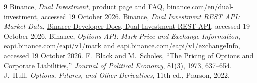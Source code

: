 \documentclass[11pt]{article}
\begin{document}
\begin{thebibliography}{9}
Binance, \emph{Dual Investment}, product page and FAQ, \href{https://www.binance.com/en/dual-investment}{binance.com/en/dual-investment}, accessed 19 October 2026.
Binance, \emph{Dual Investment REST API: Market Data}, \href{https://developers.binance.com/en/docs/catalog/investment-and-services-dual-investment/api/rest-api/market-data}{Binance Developer Docs, Dual Investment REST API}, accessed 19 October 2026.
Binance, \emph{Options API: Mark Price and Exchange Information}, \url{eapi.binance.com/eapi/v1/mark} and \url{eapi.binance.com/eapi/v1/exchangeInfo}, accessed 19 October 2026.
F.~Black and M.~Scholes, ``The Pricing of Options and Corporate Liabilities,'' \emph{Journal of Political Economy}, 81(3), 1973, 637--654.
J.~Hull, \emph{Options, Futures, and Other Derivatives}, 11th ed., Pearson, 2022.
\end{thebibliography}
\end{document}
